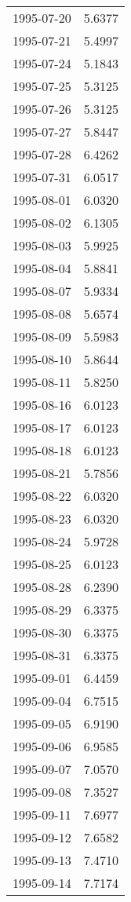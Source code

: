 \begin{tabular}{lr}
1995-07-20 &      5.6377 \\
1995-07-21 &      5.4997 \\
1995-07-24 &      5.1843 \\
1995-07-25 &      5.3125 \\
1995-07-26 &      5.3125 \\
1995-07-27 &      5.8447 \\
1995-07-28 &      6.4262 \\
1995-07-31 &      6.0517 \\
1995-08-01 &      6.0320 \\
1995-08-02 &      6.1305 \\
1995-08-03 &      5.9925 \\
1995-08-04 &      5.8841 \\
1995-08-07 &      5.9334 \\
1995-08-08 &      5.6574 \\
1995-08-09 &      5.5983 \\
1995-08-10 &      5.8644 \\
1995-08-11 &      5.8250 \\
1995-08-16 &      6.0123 \\
1995-08-17 &      6.0123 \\
1995-08-18 &      6.0123 \\
1995-08-21 &      5.7856 \\
1995-08-22 &      6.0320 \\
1995-08-23 &      6.0320 \\
1995-08-24 &      5.9728 \\
1995-08-25 &      6.0123 \\
1995-08-28 &      6.2390 \\
1995-08-29 &      6.3375 \\
1995-08-30 &      6.3375 \\
1995-08-31 &      6.3375 \\
1995-09-01 &      6.4459 \\
1995-09-04 &      6.7515 \\
1995-09-05 &      6.9190 \\
1995-09-06 &      6.9585 \\
1995-09-07 &      7.0570 \\
1995-09-08 &      7.3527 \\
1995-09-11 &      7.6977 \\
1995-09-12 &      7.6582 \\
1995-09-13 &      7.4710 \\
1995-09-14 &      7.7174 \\

\end{tabular}
